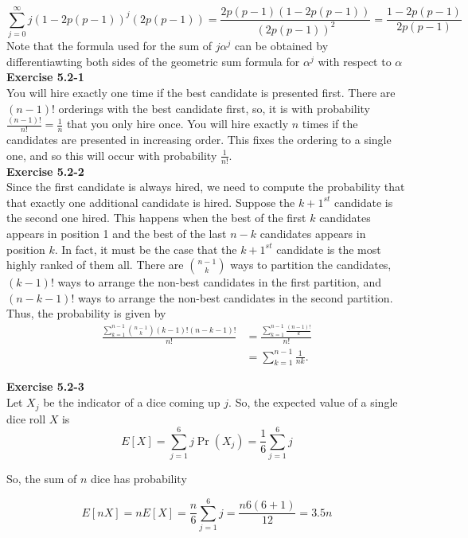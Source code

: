 \documentclass{article}
\begin{document}
\[
\sum_{j=0}^{\infty} j (1 - 2 p(p-1))^j ( 2 p (p-1)) = \frac{2p(p-1) (1 - 2p(p-1))}{( 2p(p-1))^2} = \frac{1 - 2p(p-1)}{2p(p-1)}
\]
Note that the formula used for the sum of $j\alpha^j$ can be obtained by differentiawting both sides of the geometric sum formula for $\alpha^j$ with respect to $\alpha$\\


\noindent\textbf{Exercise 5.2-1}\\

You will hire exactly one time if the best candidate is presented first. There are $(n-1)!$ orderings with the best candidate first, so, it is with probability $\frac{(n-1)!}{n!} = \frac{1}{n}$ that you only hire once.
You will hire exactly $n$ times if the candidates are presented in increasing order. This fixes the ordering to a single one, and so this will occur with probability $\frac{1}{n!}$.\\

\noindent\textbf{Exercise 5.2-2}\\

Since the first candidate is always hired, we need to compute the probability that that exactly one additional candidate is hired.  Suppose the $k+1^{st}$ candidate is the second one hired.  This happens when the best of the first $k$ candidates appears in position 1 and the best of the last $n-k$ candidates appears in position $k$.  In fact, it must be the case that the $k+1^{st}$ candidate is the most highly ranked of them all.  There are ${n-1 \choose k}$ ways to partition the candidates, $(k-1)!$ ways to arrange the non-best candidates in the first partition, and $(n-k-1)!$ ways to arrange the non-best candidates in the second partition.   Thus, the probability is given by 
\begin{align*}
 \frac{\sum_{k=1}^{n-1} {n-1 \choose k}(k-1)!(n-k-1)!}{n!} &=  \frac{\sum_{k=1}^{n-1} \frac{(n-1)!}{k}}{n!} \\
&= \sum_{k=1}^{n-1} \frac{1}{nk}.
\end{align*}


\noindent\textbf{Exercise 5.2-3}\\

Let $X_j$ be the indicator of a dice coming up $j$. So, the expected value of a single dice roll $X$ is 
\[
E[X] = \sum_{j=1}^{6} j \Pr(X_j) = \frac{1}{6} \sum_{j=1}^6 j 
\]

So, the sum of $n$ dice has probability

\[
E[nX] = nE[X] = \frac{n}{6} \sum_{j=1}^6 j = \frac{n 6(6+1)}{12} = 3.5 n
\]\\
\end{document}

